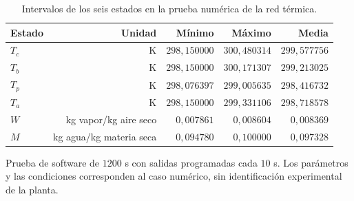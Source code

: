 \begin{table}[htbp]
\centering
\caption{Intervalos de los seis estados en la prueba numérica de la red térmica.}
\label{tab:res_red_estados}
\small
\setlength{\tabcolsep}{5pt}
\begin{tabular}{lrrrr}
\toprule
Estado & Unidad & Mínimo & Máximo & Media \\
\midrule
$T_c$ & K & $298{,}150000$ & $300{,}480314$ & $299{,}577756$ \\
$T_b$ & K & $298{,}150000$ & $300{,}171307$ & $299{,}213025$ \\
$T_p$ & K & $298{,}076397$ & $299{,}005635$ & $298{,}416732$ \\
$T_a$ & K & $298{,}150000$ & $299{,}331106$ & $298{,}718578$ \\
$W$ & kg vapor/kg aire seco & $0{,}007861$ & $0{,}008604$ & $0{,}008369$ \\
$M$ & kg agua/kg materia seca & $0{,}094780$ & $0{,}100000$ & $0{,}097328$ \\
\bottomrule
\end{tabular}
\par\vspace{3pt}
\begin{minipage}{0.98\textwidth}\footnotesize
Prueba de software de $1200$ s con salidas programadas cada $10$ s. Los parámetros y las condiciones corresponden al caso numérico, sin identificación experimental de la planta.
\end{minipage}
\end{table}
